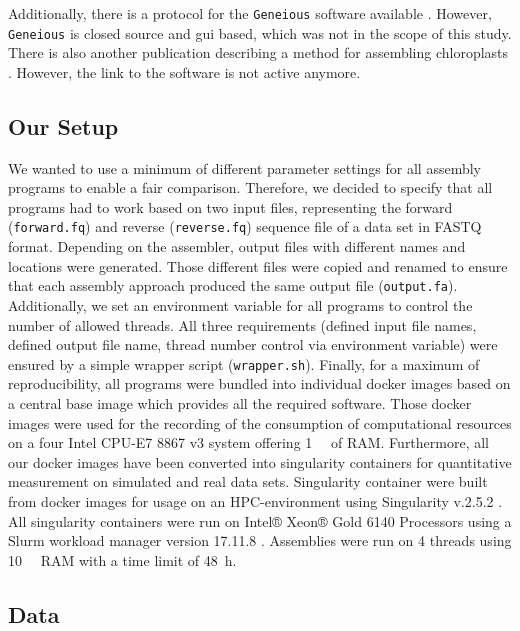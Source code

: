 \documentclass{bmcart}
\begin{document}
Additionally, there is a protocol for the \texttt{Geneious} \cite{geneious} software available \cite{geneious-protocol}.
However, \texttt{Geneious} is closed source and \gls{gui} based, which was not in the scope of this study.
There is also another publication describing a method for assembling chloroplasts \cite{method-description-paper}.
However, the link to the software is not active anymore.

\subsection*{Our Setup}
We wanted to use a minimum of different parameter settings for all assembly programs to enable a fair comparison. 
Therefore, we decided to specify that all programs had to work based on two input files, representing the forward (\texttt{forward.fq}) and reverse  (\texttt{reverse.fq}) sequence file of a data set in FASTQ format.
Depending on the assembler, output files with different names and locations were generated.
Those different files were copied and renamed to ensure that each assembly approach produced the same output file (\texttt{output.fa}). 
Additionally, we set an environment variable for all programs to control the number of allowed threads.
All three requirements (defined input file names, defined output file name, thread number control via environment variable) were ensured by a simple wrapper script (\texttt{wrapper.sh}).
Finally, for a maximum of reproducibility, all programs were bundled into individual docker images based on a central base image which provides all the required software. Those docker images were used for the recording of the consumption of computational resources on a four Intel CPU-E7 8867 v3 system offering \SI{1}{\tera\byte} of RAM.
Furthermore, all our docker images have been converted into singularity containers for quantitative measurement on simulated and real data sets.
Singularity container were built from docker images for usage on an HPC-environment using Singularity v.2.5.2 \cite{kurtzer2017singularity}.
All singularity containers were run on Intel® Xeon® Gold \num{6140} Processors using a Slurm workload manager version 17.11.8 \cite{Jette02slurm}. Assemblies were run on \num{4} threads using \SI{10}{\gibi\byte} RAM with a time limit of \SI{48}{\hour}.
\subsection*{Data}
\end{document}
